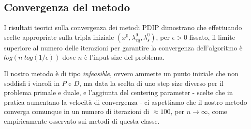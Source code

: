 \subsection{Convergenza del metodo}\label{cap:Convergenza}

I risultati teorici sulla convergenza dei metodi PDIP \cite{Nocedal2006Numerical} dimostrano che effettuando scelte appropriate sulla tripla iniziale $(x^0, \lambda_{eq}^0, \lambda_s^0)$, per $\epsilon > 0$ fissato, il limite superiore al numero delle iterazioni per garantire la convergenza dell'algoritmo è $log(n\; log(1/\epsilon))$ dove $n$ è l'input size del problema.

Il nostro metodo è di tipo \textit{infeasible}, 
ovvero ammette un punto iniziale che non soddisfi i vincoli in $P$ e $D$, ma data la scelta di uno step size diverso per il problema primale e duale, e l'aggiunta del centering parameter - scelte che in pratica aumentano la velocità di convergenza - ci aspettiamo che il nostro metodo converga comunque in un numero di iterazioni di $\approx 100$, per $n \rightarrow \infty$, come empiricamente osservato sui metodi di questa classe.


